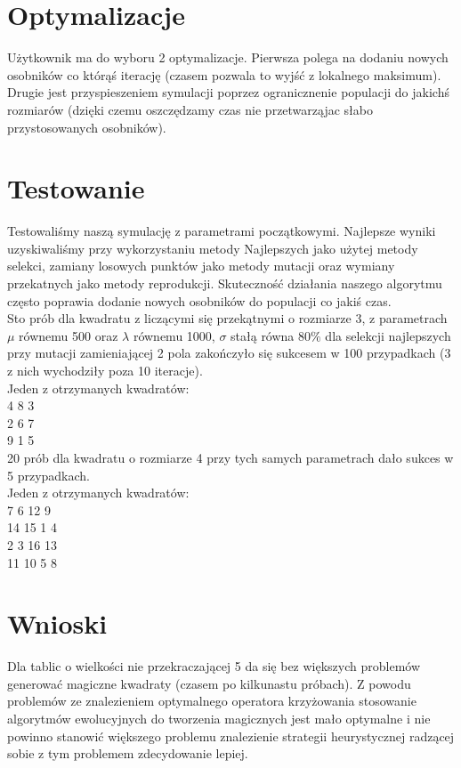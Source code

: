 \documentclass[a4paper,twoside,10pt]{article}
\begin{document}
\section{Optymalizacje}
Użytkownik ma do wyboru 2 optymalizacje. Pierwsza polega na dodaniu nowych osobników co którąś iterację (czasem pozwala to wyjść z lokalnego maksimum). Drugie jest przyspieszeniem symulacji poprzez ogranicznenie populacji do jakichś rozmiarów (dzięki czemu oszczędzamy czas nie przetwarząjac słabo przystosowanych osobników).
\section{Testowanie}
Testowaliśmy naszą symulację z parametrami początkowymi. Najlepsze wyniki uzyskiwaliśmy przy wykorzystaniu metody Najlepszych jako użytej metody selekci, zamiany losowych punktów jako metody mutacji oraz wymiany przekatnych jako metody reprodukcji. Skuteczność działania naszego algorytmu często poprawia dodanie nowych osobników do populacji co jakiś czas.\\
Sto prób dla kwadratu z liczącymi się przekątnymi o rozmiarze 3, z parametrach $\mu$ równemu 500 oraz $\lambda$ równemu 1000, $\sigma$ stałą równa $80\%$ dla selekcji najlepszych przy mutacji zamieniającej 2 pola zakończyło się sukcesem w 100 przypadkach (3 z nich wychodziły poza 10 iteracje). \\
Jeden z otrzymanych kwadratów: \\
4 8 3 \\
2 6 7 \\
9 1 5 \\
20 prób dla kwadratu o rozmiarze 4 przy tych samych parametrach dało sukces w 5 przypadkach. \\
Jeden z otrzymanych kwadratów: \\
7 6 12 9 \\
14 15 1 4\\
2 3 16 13\\
11 10 5 8 
\section{Wnioski}
Dla tablic o wielkości nie przekraczającej 5 da się bez większych problemów generować magiczne kwadraty (czasem po kilkunastu próbach). Z powodu problemów ze znalezieniem optymalnego operatora krzyżowania stosowanie algorytmów ewolucyjnych do tworzenia magicznych jest mało optymalne i nie powinno stanowić większego problemu znalezienie strategii heurystycznej radzącej sobie z tym problemem zdecydowanie lepiej.
\end{document}
